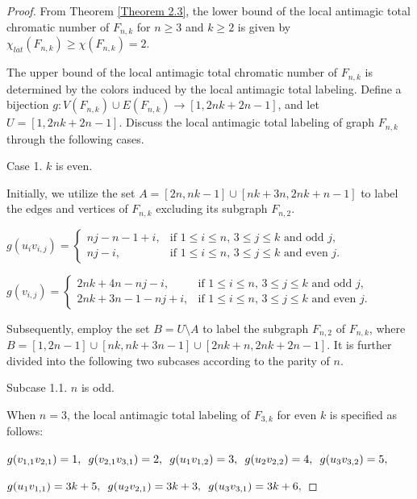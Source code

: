 \documentclass[12pt]{article}
\begin{document}
\begin{proof}
From Theorem \ref{Theorem 2.3}, the lower bound of the local antimagic total chromatic number of $F_{n,k}$ for $n\geq 3$ and $k\geq 2$ is given by $\chi_{lat}(F_{n,k})\geq\chi(F_{n,k})=2$.

The upper bound of the local antimagic total chromatic number of $F_{n,k}$ is determined by the colors induced by the local antimagic total labeling. Define a bijection $g:V(F_{n,k})\cup E(F_{n,k})\rightarrow [1,2nk+2n-1]$, and let $U=[1,2nk+2n-1]$.
Discuss the local antimagic total labeling of graph $F_{n,k}$ through the following cases.

Case 1. $k$ is even.

Initially, we utilize the set $A=[2n,nk-1]\cup[nk+3n,2nk+n-1]$ to label the edges and vertices of $F_{n,k}$ excluding its subgraph $F_{n,2}$.

$g(u_{i}v_{i,j})=\begin{cases}
nj-n-1+i, & \text{if $1\leq i\leq n$, $3\leq j\leq k$ and odd $j$},\\[4pt]
nj-i,        & \text{if $1\leq i\leq n$, $3\leq j\leq k$ and even $j$}.\end{cases}$\vspace{0.4em}

$g(v_{i,j})=\begin{cases}
2nk+4n-nj-i, & \text{if $1\leq i\leq n$, $3\leq j\leq k$ and odd $j$},\\[4pt]
2nk+3n-1-nj+i,        & \text{if $1\leq i\leq n$, $3\leq j\leq k$ and even $j$}.\end{cases}$\vspace{0.6em}

Subsequently, employ the set $B=U\setminus A$ to label the subgraph $F_{n,2}$ of $F_{n,k}$, where $B=[1,2n-1]\cup[nk,nk+3n-1]\cup[2nk+n,2nk+2n-1]$.
It is further divided into the following two subcases according to the parity of $n$.

Subcase 1.1.  $n$ is odd.

When $n=3$, the local antimagic total labeling of $F_{3,k}$ for even $k$ is specified as follows:

$g(v_{1,1}v_{2,1})=1,\hspace{0.5em} g(v_{2,1}v_{3,1})=2, \hspace{0.5em}g(u_{1}v_{1,2})=3, \hspace{0.5em}g(u_{2}v_{2,2})=4, \hspace{0.5em}g(u_{3}v_{3,2})=5,$

$g(u_{1}v_{1,1})=3k+5,\hspace{0.5em}g(u_{2}v_{2,1})=3k+3,\hspace{0.5em}g(u_{3}v_{3,1})=3k+6,$\vspace{0.5em}


\end{proof}
\end{document}
